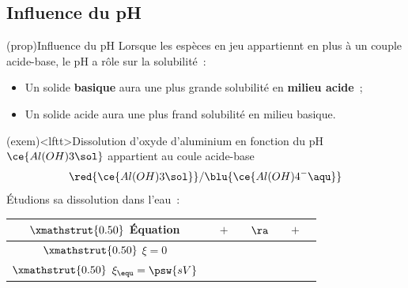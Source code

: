\documentclass[../../main/main.tex]{subfiles}
\begin{document}
\subsection{Influence du pH}
\begin{tcb*}(prop){Influence du pH}
	Lorsque les espèces en jeu appartiennt en plus à un couple acide-base, le pH a
	rôle sur la solubilité~:
	\begin{itemize}
		\item Un solide \textbf{basique} aura une plus grande solubilité en
		      \textbf{milieu acide}~;
		\item Un solide acide aura une plus frand solubilité en milieu basique.
	\end{itemize}
\end{tcb*}
\begin{tcb*}(exem)<lftt>{Dissolution d'oxyde d'aluminium en fonction du pH}
	$\ce{Al(OH)3\sol}$ appartient au coule acide-base
	\[
		\red{\ce{Al(OH)3\sol}}/\blu{\ce{Al(OH)4^-\aqu}}
	\]
	Étudions sa dissolution dans l'eau~:
	\smallbreak
	\noindent
	\begin{minipage}[c]{.69\linewidth}
		\begin{center}
			\def\rhgt{0.50}
			\centering
			\begin{tabularx}{\linewidth}{|c||YdYdYdY|}
				\hline
				$\xmathstrut{\rhgt}$ \textbf{Équation} &
				               & $+$    &
				                  & $\ra$  &
				             & $+$    &
				                               \\
				\hline
				$\xmathstrut{\rhgt}$
				$\xi = 0$                              &
				                              & \vline &
				                            & \vline &
				                              & \vline &
				                              \\
				\hline
				$\xmathstrut{\rhgt}$
				$\xi_{\equ} = \psw{sV}$                &
				                         & \vline &
				                            & \vline &
				                             & \vline &
				                                \\
				\hline
			\end{tabularx}
		\end{center}
		\vspace{-15pt}
\end{minipage}
\end{tcb*}
\end{document}
